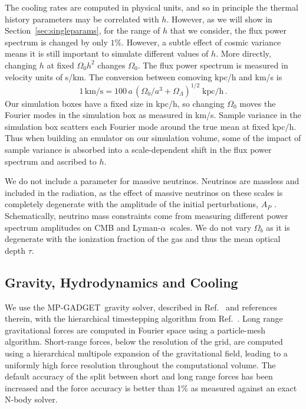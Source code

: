 \documentclass[a4paper,11pt]{article}
\newcommand{\Lya}{Lyman-$\alpha$}
\newcommand{\mpgadget}{{\small MP-GADGET}}
\begin{document}
The cooling rates are computed in physical units, and so in principle the thermal history parameters may be correlated with $h$. However, as we will show in Section~\ref{sec:singleparams}, for the range of $h$ that we consider, the flux power spectrum is changed by only $1\%$. However, a subtle effect of cosmic variance means it is still important to simulate different values of $h$. More directly, changing $h$ at fixed $\Omega_0 h^2$ changes $\Omega_0$. The flux power spectrum is measured in velocity units of s/km. The conversion between comoving kpc/h and km/s is
\begin{equation}
 1 \,\mathrm{km/s} =  100\, a \,(\Omega_0 /a^3 + \Omega_\Lambda )^{1/2}\; \mathrm{kpc/h}\,.
\end{equation}
Our simulation boxes have a fixed size in kpc/h, so changing $\Omega_0$ moves the Fourier modes in the simulation box as measured in km/s. Sample variance in the simulation box scatters each Fourier mode around the true mean at fixed kpc/h. Thus when building an emulator on our simulation volume, some of the impact of sample variance is absorbed into a scale-dependent shift in the flux power spectrum and ascribed to $h$.

We do not include a parameter for massive neutrinos. Neutrinos are massless and included in the radiation, as the effect of massive neutrinos on these scales is completely degenerate with the amplitude of the initial perturbations, $A_P$ \cite{Pedersen:2020}.
Schematically, neutrino mass constraints come from measuring different power spectrum amplitudes on CMB and \Lya~scales. We do not vary $\Omega_b$ as it is degenerate with the ionization fraction of the gas and thus the mean optical depth $\tau$.

\subsection{Gravity, Hydrodynamics and Cooling}
\label{sec:gravity}

We use the \mpgadget~gravity solver, described in Ref.~\cite{Bird:2022} and references therein, with the hierarchical timestepping algorithm from Ref.~\cite{Springel:2021}. Long range gravitational forces are computed in Fourier space using a particle-mesh algorithm. Short-range forces, below the resolution of the grid, are computed using a hierarchical multipole expansion of the gravitational field, leading to a uniformly high force resolution throughout the computational volume. The default accuracy of the split between short and long range forces has been increased and the force accuracy is better than 1\% as measured against an exact N-body solver.
\end{document}
